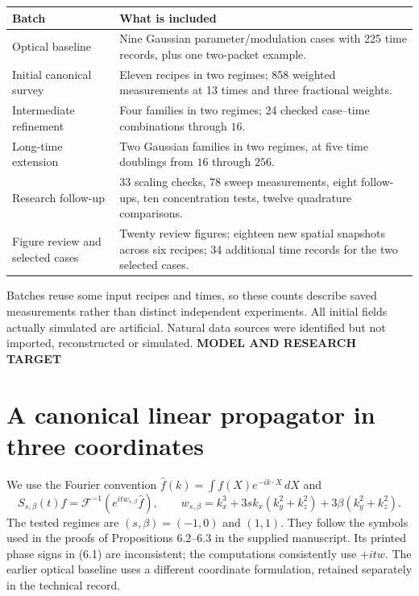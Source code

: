 \documentclass[10pt,letterpaper]{article}
\newcommand{\eyebrow}[1]{{\color{teal}\normalsize\bfseries #1}\par}
\begin{document}
\begin{tabular}{p{.30\linewidth}p{.63\linewidth}}\toprule
Batch & What is included\\\midrule
Optical baseline & Nine Gaussian parameter/modulation cases with 225 time records,
plus one two-packet example.\\
Initial canonical survey & Eleven recipes in two regimes; 858 weighted measurements
at 13 times and three fractional weights.\\
Intermediate refinement & Four families in two regimes; 24 checked case--time
combinations through $16$.\\
Long-time extension & Two Gaussian families in two regimes, at five time doublings
from $16$ through $256$.\\
Research follow-up & 33 scaling checks, 78 sweep measurements, eight follow-ups,
ten concentration tests, twelve quadrature comparisons.\\
Figure review and selected cases & Twenty review figures; eighteen new spatial
snapshots across six recipes; 34 additional time records for the two selected cases.\\\bottomrule
\end{tabular}

Batches reuse some input recipes and times, so these counts describe saved
measurements rather than distinct independent experiments. All initial fields
actually simulated are artificial. Natural data sources were identified but not
imported, reconstructed or simulated.
\newpage
{}\label{target}
\eyebrow{MODEL AND RESEARCH TARGET}
\section*{A canonical linear propagator in three coordinates}
We use the Fourier convention $\widehat f(k)=\int f(X)e^{-ik\cdot X}\,dX$ and
\[
 S_{s,\beta}(t)f=\mathcal F^{-1}(e^{itw_{s,\beta}}\widehat f),\qquad
 w_{s,\beta}=k_x^3+3s k_x(k_y^2+k_z^2)+3\beta(k_y^2+k_z^2).
\]
The tested regimes are $(s,\beta)=(-1,0)$ and $(1,1)$. They follow the symbols
used in the proofs of Propositions 6.2--6.3 in the supplied manuscript. Its printed
phase signs in (6.1) are inconsistent; the computations consistently use $+itw$.
The earlier optical baseline uses a different coordinate formulation, retained
separately in the technical record.
\end{document}
